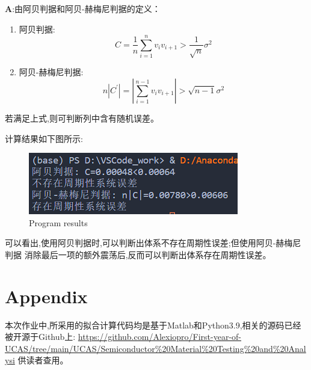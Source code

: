 \documentclass[homework]{IEEEtran}
\begin{document}
\begin{CJK}{UTF8}{gkai}
$\mathbf{A}$:由阿贝判据和阿贝-赫梅尼判据的定义：
\begin{enumerate}
\item 阿贝判据: 
$$
C=\frac{1}{n} \sum_{i=1}^{n} v_{i} v_{i+1}>\frac{1}{\sqrt{n}} \sigma^{2}
$$
\item 阿贝-赫梅尼判据: 
$$
n\left|C^{\prime}\right|=\left|\sum_{i=1}^{n-1} v_{i} v_{i+1}\right|>\sqrt{n-1} \sigma^{2}
$$
\end{enumerate}
若满足上式,则可判断列中含有随机误差。   \par
计算结果如下图所示:        \par
\begin{figure}[htb]
\centerline{\includegraphics{Images/fig4.png}}
\caption{Program results}
\label{fig4}
\end{figure}
可以看出,使用阿贝判据时,可以判断出体系不存在周期性误差;但使用阿贝-赫梅尼判据
消除最后一项的额外震荡后,反而可以判断出体系存在周期性误差。
\end{CJK}

\section{Appendix}
\begin{CJK}{UTF8}{gkai}
    本次作业中,所采用的拟合计算代码均是基于Matlab和Python3.9,相关的源码已经被开源于Github上:
    \url{https://github.com/Alexiopro/First-year-of-UCAS/tree/main/UCAS/Semiconductor%20Material%20Testing%20and%20Analysi}
    供读者查用。 \par
\end{CJK}
\end{document}
